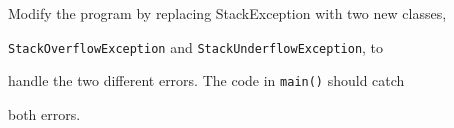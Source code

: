 \begin{console}[commandchars=\~\@\$]
{{{{                    case 0: stack.push(rand()); break;

                    case 1: stack.pop(); break;}}}}

              }

              std::cout << stack << std::endl;

         }

     }

     catch (~EMPHASIZE@StackException e$)

     {

          std::cout << "stack error" << std::endl;

     }

} 

\end{console}



Modify the program by replacing StackException with two new classes,

\texttt{StackOverflowException} and \texttt{StackUnderflowException}, to

handle the two different errors. The code in \texttt{main()} should catch

both errors.

